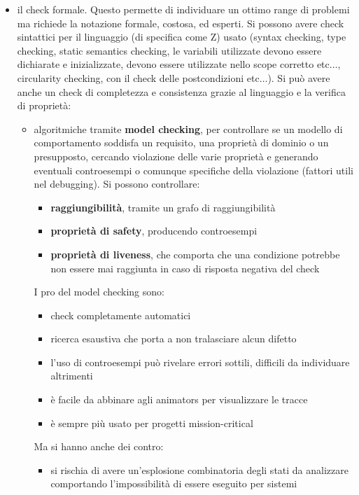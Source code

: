 \documentclass[a4paper,12pt, oneside]{book}
\begin{document}
\begin{itemize}
  \item il check formale. Questo permette di individuare un ottimo range di
  problemi ma richiede la notazione formale, costosa, ed esperti. Si possono
  avere check sintattici per il linguaggio (di specifica come Z) usato (syntax
  checking, type checking, static semantics checking, le variabili utilizzate
  devono essere dichiarate e inizializzate, devono essere utilizzate
  nello scope corretto etc$\ldots$, circularity checking, con il check delle
  postcondizioni etc$\ldots$). Si può 
  avere anche un check di completezza e consistenza grazie al linguaggio e la
  verifica di proprietà:
  \begin{itemize}
    \item algoritmiche tramite \textbf{model checking}, per controllare se un
    modello di 
    comportamento soddisfa un requisito, una proprietà di dominio o un
    presupposto, cercando violazione delle varie proprietà e generando eventuali
    controesempi o comunque specifiche della violazione (fattori utili nel
    debugging). Si possono controllare:
    \begin{itemize}
      \item \textbf{raggiungibilità}, tramite un grafo di raggiungibilità
      \item \textbf{proprietà di safety}, producendo controesempi 
      \item \textbf{proprietà di liveness}, che comporta che una condizione
      potrebbe non essere mai raggiunta in caso di risposta negativa del check
    \end{itemize}
    I pro del model checking sono:
    \begin{itemize}
      \item check completamente automatici
      \item ricerca esaustiva che porta a non tralasciare alcun difetto
      \item l'uso di controesempi può rivelare errori sottili, difficili da
      individuare altrimenti 
      \item è facile da abbinare agli animators per visualizzare le tracce
      \item è sempre più usato per progetti mission-critical
    \end{itemize}
    Ma si hanno anche dei contro:
    \begin{itemize}
      \item si rischia di avere un'esplosione combinatoria degli stati da
      analizzare comportando l'impossibilità di essere eseguito per sistemi

\end{itemize}
\end{itemize}
\end{itemize}
\end{document}
